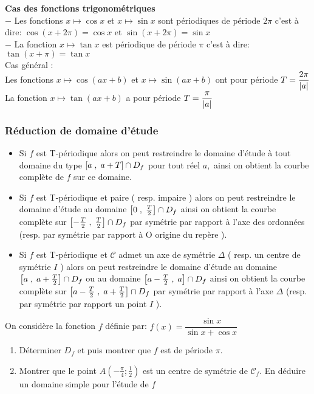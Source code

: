 \textbf{\color{blue}Cas des fonctions trigonométriques}\\
$ - $ Les fonctions $x\mapsto\cos x $ et $x\mapsto\sin x $ sont périodiques de période $ 2\pi $  c'est à dire: \colorbox{green!20!}{ $ \cos (x+2\pi)=\cos x $ et  $ \sin (x+2\pi)=\sin x $ }\\

$ - $ La fonction $x\mapsto\tan x $ est périodique de période $ \pi $ c'est à dire:       \colorbox{green!20!} {$ \tan (x+\pi)=\tan x $}\\

\colorbox{magenta!20!}{Cas général }: \\
Les fonctions $x \mapsto \cos (ax+b) $ et $x \mapsto \sin (ax+b) $ ont pour période $ T=\dfrac{2\pi}{\left\lvert a \right\rvert}$ \\
La fonction $x \mapsto \tan (ax+b) $ a pour période $ T=\dfrac{\pi}{\left\lvert a \right\rvert}$ 

\subsubsection*{Réduction de domaine d'étude}

\begin{itemize}
\item[\textbullet] Si $ f $ est T-périodique alors on peut restreindre le domaine d'étude à tout domaine du type $ \left[a\;,\; a+T\right]\cap D_{f} $ pour tout réel $ a, $ ainsi on obtient la courbe complète de $ f$ sur ce domaine.
\item[\textbullet] Si $ f $ est T-périodique   et paire ( resp. impaire ) alors on peut restreindre le domaine d'étude au domaine  $ \left[0\;,\; \frac{T}{2}\right]\cap D_{f} $  ainsi on obtient la courbe complète sur $ \left[-\frac{T}{2}\;,\; \frac{T}{2}\right]\cap D_{f} $ par symétrie par rapport à l'axe des ordonnées (resp. par symétrie par rapport à O origine du repère ).
\item[\textbullet] Si $ f $ est T-périodique   et $ \mathcal{C} $  admet un axe de symétrie $ \Delta $ ( resp. un centre de symétrie $ I $ ) alors on peut restreindre le domaine d'étude au domaine \\ $ \left[a\;,\; a+\frac{T}{2}\right]\cap D_{f} $ ou au domaine  $ \left[a-\frac{T}{2}\;,\; a\right]\cap D_{f} $ ainsi on obtient la courbe complète sur $ \left[a-\frac{T}{2}\;,\; a+\frac{T}{2}\right]\cap D_{f} $ par symétrie par rapport à l'axe $ \Delta $  (resp. par symétrie par rapport un point $ I $ ).
\end{itemize}

 \begin{exercice}
On considère  la fonction $ f $ définie par: $ f(x)= \dfrac{\sin x }{\sin x+\cos x} $ 
\begin{enumerate}
\item Déterminer $ D_{f} $ et  puis montrer que  $ f$ est de période  $ \pi. $
\item Montrer que le point  $ A(-\frac{\pi}{4}; \frac{1}{2}) $ est un centre de symétrie de $ \mathcal{C}_{f} $. En déduire un domaine simple pour l'étude de $ f $ 
\end{enumerate}
 \end{exercice}

